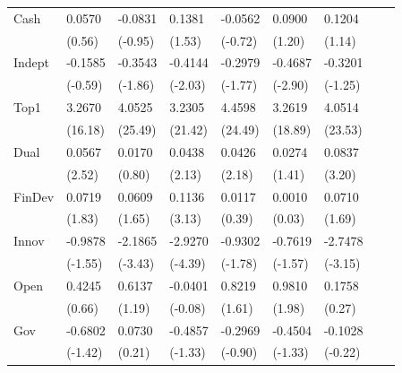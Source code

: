 \begin{table}[htbp]
\begin{tabularx}{\textwidth}{lYYYYYYYY@{}}
Cash            &   0.0570         &  -0.0831         &   0.1381         &  -0.0562         &   0.0900         &   0.1204         \\
                &   (0.56)         &  (-0.95)         &   (1.53)         &  (-0.72)         &   (1.20)         &   (1.14)         \\
Indept          &  -0.1585         &  -0.3543\sym{*}  &  -0.4144\sym{**} &  -0.2979\sym{*}  &  -0.4687\sym{***}&  -0.3201         \\
                &  (-0.59)         &  (-1.86)         &  (-2.03)         &  (-1.77)         &  (-2.90)         &  (-1.25)         \\
Top1            &   3.2670\sym{***}&   4.0525\sym{***}&   3.2305\sym{***}&   4.4598\sym{***}&   3.2619\sym{***}&   4.0514\sym{***}\\
                &  (16.18)         &  (25.49)         &  (21.42)         &  (24.49)         &  (18.89)         &  (23.53)         \\
Dual            &   0.0567\sym{**} &   0.0170         &   0.0438\sym{**} &   0.0426\sym{**} &   0.0274         &   0.0837\sym{***}\\
                &   (2.52)         &   (0.80)         &   (2.13)         &   (2.18)         &   (1.41)         &   (3.20)         \\
FinDev          &   0.0719\sym{*}  &   0.0609\sym{*}  &   0.1136\sym{***}&   0.0117         &   0.0010         &   0.0710\sym{*}  \\
                &   (1.83)         &   (1.65)         &   (3.13)         &   (0.39)         &   (0.03)         &   (1.69)         \\
Innov           &  -0.9878         &  -2.1865\sym{***}&  -2.9270\sym{***}&  -0.9302\sym{*}  &  -0.7619         &  -2.7478\sym{***}\\
                &  (-1.55)         &  (-3.43)         &  (-4.39)         &  (-1.78)         &  (-1.57)         &  (-3.15)         \\
Open            &   0.4245         &   0.6137         &  -0.0401         &   0.8219         &   0.9810\sym{**} &   0.1758         \\
                &   (0.66)         &   (1.19)         &  (-0.08)         &   (1.61)         &   (1.98)         &   (0.27)         \\
Gov             &  -0.6802         &   0.0730         &  -0.4857         &  -0.2969         &  -0.4504         &  -0.1028         \\
                &  (-1.42)         &   (0.21)         &  (-1.33)         &  (-0.90)         &  (-1.33)         &  (-0.22)         \\

\end{tabularx}
\end{table}
